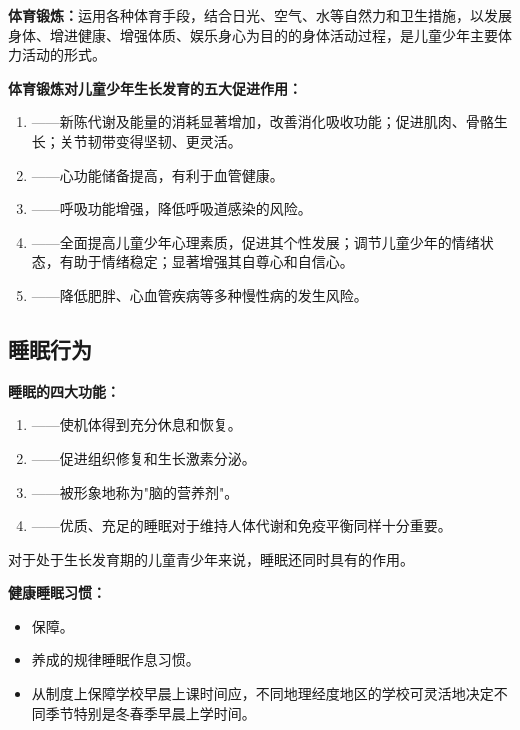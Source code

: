 \begin{keybox}
\textbf{体育锻炼：}运用各种体育手段，结合日光、空气、水等自然力和卫生措施，以发展身体、增进健康、增强体质、娱乐身心为目的的身体活动过程，是儿童少年主要体力活动的形式。

\textbf{体育锻炼对儿童少年生长发育的五大促进作用：}
\begin{enumerate}[leftmargin=*]
    \item {}——新陈代谢及能量的消耗显著增加，改善消化吸收功能；促进肌肉、骨骼生长；关节韧带变得坚韧、更灵活。
    \item {}——心功能储备提高，有利于血管健康。
    \item {}——呼吸功能增强，降低呼吸道感染的风险。
    \item {}——全面提高儿童少年心理素质，促进其个性发展；调节儿童少年的情绪状态，有助于情绪稳定；显著增强其自尊心和自信心。
    \item {}——降低肥胖、心血管疾病等多种慢性病的发生风险。
\end{enumerate}
\end{keybox}

\subsection{睡眠行为}

\begin{keybox}
\textbf{睡眠的四大功能：}
\begin{enumerate}[leftmargin=*]
    \item {}——使机体得到充分休息和恢复。
    \item {}——促进组织修复和生长激素分泌。
    \item {}——被形象地称为"脑的营养剂"。
    \item {}——优质、充足的睡眠对于维持人体代谢和免疫平衡同样十分重要。
\end{enumerate}

对于处于生长发育期的儿童青少年来说，睡眠还同时具有的作用。

\textbf{健康睡眠习惯：}
\begin{itemize}[leftmargin=*]
    \item 保障。
    \item 养成的规律睡眠作息习惯。
    \item 从制度上保障学校早晨上课时间应，不同地理经度地区的学校可灵活地决定不同季节特别是冬春季早晨上学时间。
\end{itemize}
\end{keybox}

